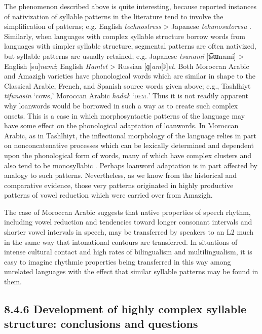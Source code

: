   The phenomenon described above is quite interesting, because reported instances of nativization of syllable patterns in the literature tend to involve the simplification of patterns; e.g. English \textit{technostress} > Japanese \textit{tekunosutoresu} \citep[69]{Kay1995}. Similarly, when languages with complex syllable structure borrow words from languages with simpler syllable structure, segmental patterns are often nativized, but syllable patterns are usually retained; e.g. Japanese \textit{tsunami} [t͡sɯnami] > English [su]\textit{nami}; English \textit{Hamlet} > Russian [ɡ]\textit{am}[lʲ]\textit{et}. Both Moroccan Arabic and Amazigh varieties have phonological words which are similar in shape to the Classical Arabic, French, and Spanish source words given above; e.g., Tashlhiyt \textit{tifunasin} ‘cows,’ Moroccan Arabic \textit{hadak} ‘\textsc{dem.}’ Thus it is not readily apparent why loanwords would be borrowed in such a way as to create such complex onsets. This is a case in which morphosyntactic patterns of the language may have some effect on the phonological adaptation of loanwords. In Moroccan Arabic, as in Tashlhiyt, the inflectional morphology of the language relies in part on nonconcatenative processes which can be lexically determined and dependent upon the phonological form of words, many of which have complex clusters and also tend to be monosyllabic \citep{Heath2007}. Perhaps loanword adaptation is in part affected by analogy to such patterns. Nevertheless, as we know from the historical and comparative evidence, those very patterns originated in highly productive patterns of vowel reduction which were carried over from Amazigh.

  The case of Moroccan Arabic suggests that native properties of speech rhythm, including vowel reduction and tendencies toward longer consonant intervals and shorter vowel intervals in speech, may be transferred by speakers to an L2 much in the same way that intonational contours are transferred. In situations of intense cultural contact and high rates of bilingualism and multilingualism, it is easy to imagine rhythmic properties being transferred in this way among unrelated languages with the effect that similar syllable patterns may be found in them.

\subsection{8.4.6 Development of highly complex syllable structure: conclusions and questions}

